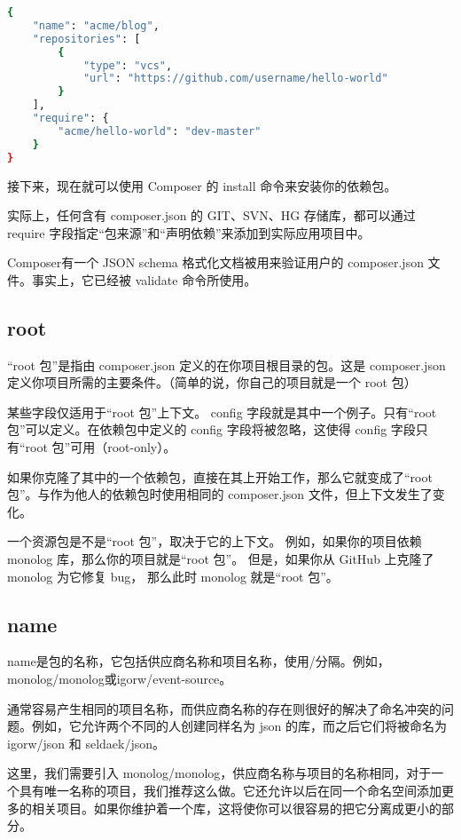 \begin{lstlisting}[language=bash]
{
    "name": "acme/blog",
    "repositories": [
        {
            "type": "vcs",
            "url": "https://github.com/username/hello-world"
        }
    ],
    "require": {
        "acme/hello-world": "dev-master"
    }
}
\end{lstlisting}


接下来，现在就可以使用 Composer 的 install 命令来安装你的依赖包。

实际上，任何含有 composer.json 的 GIT、SVN、HG 存储库，都可以通过 require 字段指定“包来源”和“声明依赖”来添加到实际应用项目中。

Composer有一个 JSON schema 格式化文档被用来验证用户的 composer.json 文件。事实上，它已经被 validate 命令所使用。

\subsection{root}

“root 包”是指由 composer.json 定义的在你项目根目录的包。这是 composer.json 定义你项目所需的主要条件。（简单的说，你自己的项目就是一个 root 包）

某些字段仅适用于“root 包”上下文。 config 字段就是其中一个例子。只有“root 包”可以定义。在依赖包中定义的 config 字段将被忽略，这使得 config 字段只有“root 包”可用（root-only）。

如果你克隆了其中的一个依赖包，直接在其上开始工作，那么它就变成了“root 包”。与作为他人的依赖包时使用相同的 composer.json 文件，但上下文发生了变化。

一个资源包是不是“root 包”，取决于它的上下文。 例如，如果你的项目依赖 monolog 库，那么你的项目就是“root 包”。 但是，如果你从 GitHub 上克隆了 monolog 为它修复 bug， 那么此时 monolog 就是“root 包”。


\subsection{name}

name是包的名称，它包括供应商名称和项目名称，使用/分隔。例如，monolog/monolog或igorw/event-source。


通常容易产生相同的项目名称，而供应商名称的存在则很好的解决了命名冲突的问题。例如，它允许两个不同的人创建同样名为 json 的库，而之后它们将被命名为 igorw/json 和 seldaek/json。

这里，我们需要引入 monolog/monolog，供应商名称与项目的名称相同，对于一个具有唯一名称的项目，我们推荐这么做。它还允许以后在同一个命名空间添加更多的相关项目。如果你维护着一个库，这将使你可以很容易的把它分离成更小的部分。


